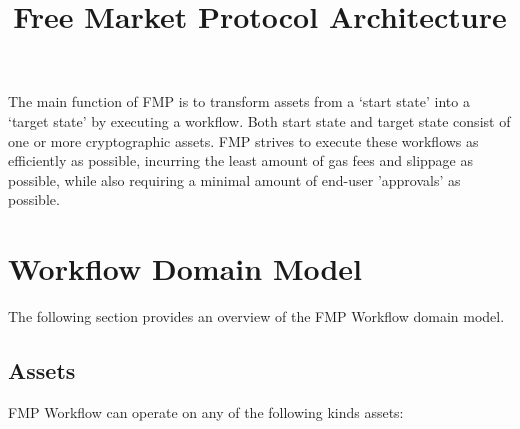 \documentclass[oneside]{article}
\begin{document}
\title{Free Market Protocol Architecture}
\maketitle


The main function of FMP is to transform assets from a `start state' into a `target state' by executing a workflow. Both start state and target state consist of one or more cryptographic assets.  
FMP strives to execute these workflows as efficiently as possible, incurring the least amount of gas fees and slippage as possible, while also requiring a minimal amount of end-user 'approvals' as possible.

\section*{Workflow Domain Model}
The following section provides an overview of the FMP Workflow domain model.
\subsection*{Assets}
FMP Workflow can operate on any of the following kinds assets:

\renewcommand{\umlfillcolor}{yellow!4}
\renewcommand{\umldrawcolor}{black}
\begin{center}
\end{center}
\end{document}
